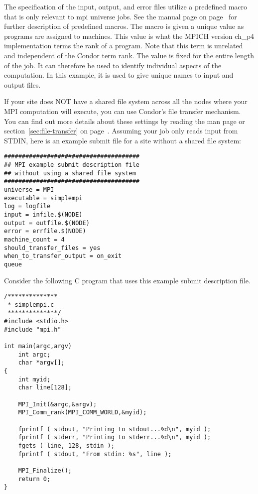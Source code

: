 The specification of the input, output, and error files
utilize a predefined macro that is only relevant to
mpi universe jobs.
See the  manual page on
page~\pageref{man-condor-submit} 
for further description of predefined macros.
The  macro is given a unique value as
programs are assigned to machines.
This value is what the MPICH version ch\_p4 implementation
terms the rank of a program.
Note that this term is unrelated and independent of the
Condor term rank.
The  value is fixed for the entire length
of the job.
It can therefore be used to identify individual aspects
of the computation.
In this example, it is used to give unique names to input
and output files.

If your site does NOT have a shared file system across all the nodes
where your MPI computation will execute, you can use Condor's file
transfer mechanism.
You can find out more details about these settings by reading the
 man page or section~\ref{sec:file-transfer} on
page~\pageref{sec:file-transfer}. 
Assuming your job only reads input from STDIN, here is an example
submit file for a site without a shared file system:

\begin{verbatim}
######################################
## MPI example submit description file
## without using a shared file system
######################################
universe = MPI
executable = simplempi
log = logfile
input = infile.$(NODE)
output = outfile.$(NODE)
error = errfile.$(NODE)
machine_count = 4
should_transfer_files = yes
when_to_transfer_output = on_exit
queue
\end{verbatim}

Consider the following C program that uses this example submit
description file.

\begin{verbatim}
/**************
 * simplempi.c
 **************/
#include <stdio.h>
#include "mpi.h"

int main(argc,argv)
    int argc;
    char *argv[];
{
    int myid;
    char line[128];

    MPI_Init(&argc,&argv);
    MPI_Comm_rank(MPI_COMM_WORLD,&myid);

    fprintf ( stdout, "Printing to stdout...%d\n", myid );
    fprintf ( stderr, "Printing to stderr...%d\n", myid );
    fgets ( line, 128, stdin );
    fprintf ( stdout, "From stdin: %s", line );

    MPI_Finalize();
    return 0;
}
\end{verbatim}

